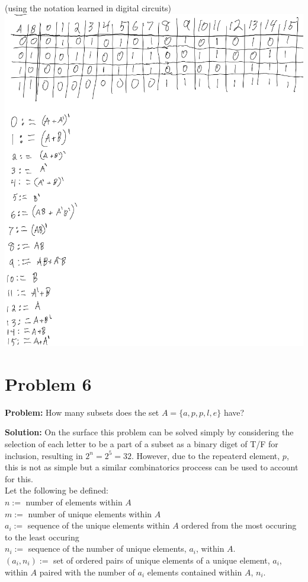 \documentclass[]{article}
\begin{document}
\newpage
(using the notation learned in digital circuits)\\
\includegraphics[width=\textwidth]{fig/pblm5_op2all_soln.png}


\newpage
\section{Problem 6}
\textbf{Problem:}
How many subsets does the set $A = \{a,p,p,l,e\}$ have?

\textbf{Solution:}
On the surface this problem can be solved simply by considering the selection of
each letter to be a part of a subset as a binary diget of T/F for inclusion,
resulting in $2^n = 2^5 = 32$.
However, due to the repeaterd element, $p$, this is not as simple but a similar
combinatorics proccess can be used to account for this.\\

Let the following be defined:\\
$n :=$ number of elements within $A$\\
$m :=$ number of unique elements within $A$\\
${a_i} :=$ sequence of the unique elements within $A$ ordered from 
the most occuring to the least occuring\\
${n_i} :=$ sequence of the number of unique elements, $a_i$, within $A$.\\
${(a_i,n_i)} := $ set of ordered pairs of unique elements of a unique
element, $a_i$, within $A$ paired with the number of $a_i$ elements contained
within $A$, $n_i$.\\
\end{document}
